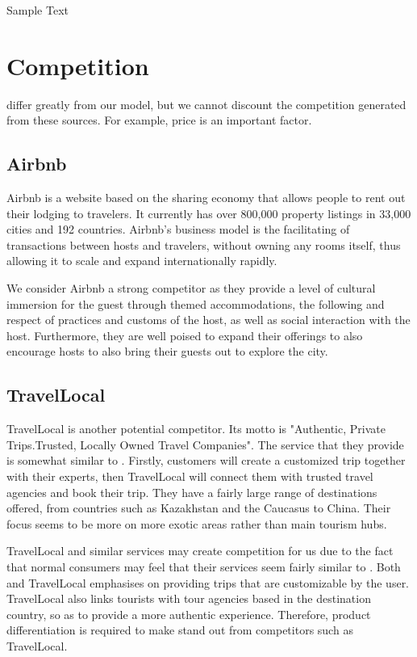 \begin{savequote}[75mm] 
Sample Text
\end{savequote}

\chapter{Competition}

 differ greatly from our model, but we cannot discount the competition generated from these sources. For example, price is an important factor.

\section{Airbnb}
Airbnb is a website based on the sharing economy that allows people to rent out their lodging to travelers. It currently has over 800,000 property listings in 33,000 cities and 192 countries. Airbnb's business model is the facilitating of transactions between hosts and travelers, without owning any rooms itself, thus allowing it to scale and expand internationally rapidly.

We consider Airbnb a strong competitor as they provide a level of cultural immersion for the guest through themed accommodations, the following and respect of practices and customs of the host, as well as social interaction with the host. Furthermore, they are well poised to expand their offerings to also encourage hosts to also bring their guests out to explore the city.

\section{TravelLocal} 
TravelLocal is another potential competitor. Its motto is "Authentic, Private Trips.Trusted, Locally Owned Travel Companies". The service that they provide is somewhat similar to \name. Firstly, customers will create a customized trip together with their experts, then TravelLocal will connect them with trusted travel agencies and book their trip. They have a fairly large range of destinations offered, from countries such as Kazakhstan and the Caucasus to China. Their focus seems to be more on more exotic areas rather than main tourism hubs.

TravelLocal and similar services may create competition for us due to the fact that normal consumers may feel that their services seem fairly similar to \name. Both \name and TravelLocal emphasises on providing trips that are customizable by the user. TravelLocal also links tourists with tour agencies based in the destination country, so as to provide a more authentic experience. Therefore, product differentiation is required to make \name stand out from competitors such as TravelLocal.

